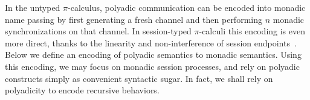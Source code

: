 In the untyped $\pi$-calculus, polyadic communication
can be encoded into monadic name passing by first generating a fresh channel and then 
performing $n$ monadic synchronizations on that channel. 
In session-typed $\pi$-calculi this encoding is even more direct, 
thanks to the linearity and non-interference  of session endpoints~\cite{VascoFun}.
Below we  define an encoding of polyadic semantics to monadic semantics.
Using this encoding, %
we may focus on monadic session processes,
and rely on polyadic constructs simply as convenient syntactic sugar.
In fact, we shall rely on polyadicity to encode recursive behaviors.
%

